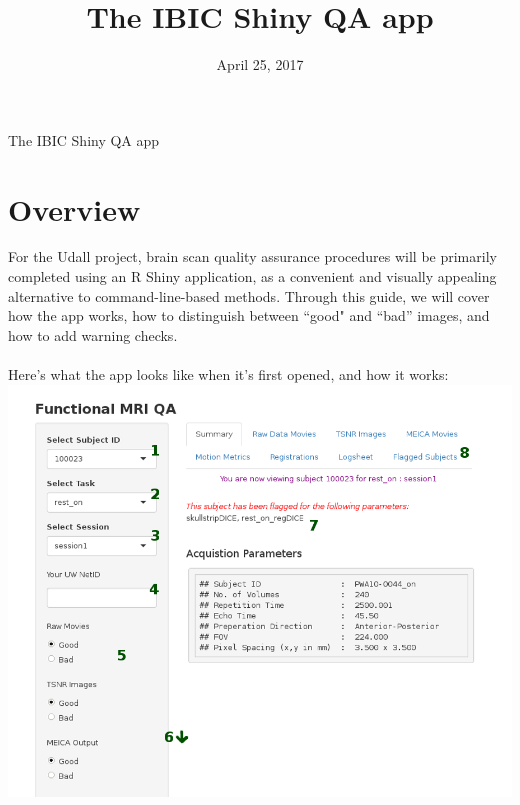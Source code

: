 \documentclass{article}
\title{The IBIC Shiny QA app}
\date{April 25, 2017}
\begin{document}
	
\begin{center}
	\LARGE{The IBIC Shiny QA app}
\end{center}
\section{Overview}
For the Udall project, brain scan quality assurance procedures will be primarily completed using an R Shiny application, as a convenient and visually appealing alternative to command-line-based methods. Through this guide, we will cover how the app works, how to distinguish between ``good" and ``bad'' images, and how to add warning checks. \\\\
Here's what the app looks like when it's first opened, and how it works: \newline
\includegraphics[scale=0.4]{shiny_summary_numbered.png}
\end{document}
